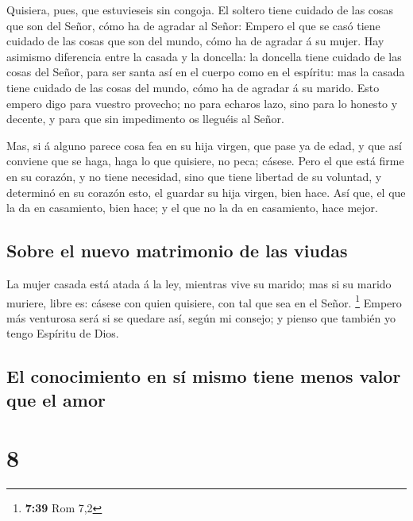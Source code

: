  Quisiera, pues, que estuvieseis sin congoja. El soltero
tiene cuidado de las cosas que son del Señor, cómo ha de agradar al
Señor:  Empero el que se casó tiene cuidado de las cosas
que son del mundo, cómo ha de agradar á su mujer.  Hay
asimismo diferencia entre la casada y la doncella: la doncella tiene
cuidado de las cosas del Señor, para ser santa así en el cuerpo como en
el espíritu: mas la casada tiene cuidado de las cosas del mundo, cómo ha
de agradar á su marido.  Esto empero digo para vuestro
provecho; no para echaros lazo, sino para lo honesto y decente, y para
que sin impedimento os lleguéis al Señor.

 Mas, si á alguno parece cosa fea en su hija virgen, que
pase ya de edad, y que así conviene que se haga, haga lo que quisiere,
no peca; cásese.  Pero el que está firme en su corazón, y
no tiene necesidad, sino que tiene libertad de su voluntad, y determinó
en su corazón esto, el guardar su hija virgen, bien hace. 
Así que, el que la da en casamiento, bien hace; y el que no la da en
casamiento, hace mejor.

\hypertarget{sobre-el-nuevo-matrimonio-de-las-viudas}{%
\subsection{Sobre el nuevo matrimonio de las
viudas}\label{sobre-el-nuevo-matrimonio-de-las-viudas}}

 La mujer casada está atada á la ley, mientras vive su
marido; mas si su marido muriere, libre es: cásese con quien quisiere,
con tal que sea en el Señor. \footnote{\textbf{7:39} Rom 7,2}
 Empero más venturosa será si se quedare así, según mi
consejo; y pienso que también yo tengo Espíritu de Dios.

\hypertarget{el-conocimiento-en-suxed-mismo-tiene-menos-valor-que-el-amor}{%
\subsection{El conocimiento en sí mismo tiene menos valor que el
amor}\label{el-conocimiento-en-suxed-mismo-tiene-menos-valor-que-el-amor}}

\hypertarget{section-7}{%
\section{8}\label{section-7}}


